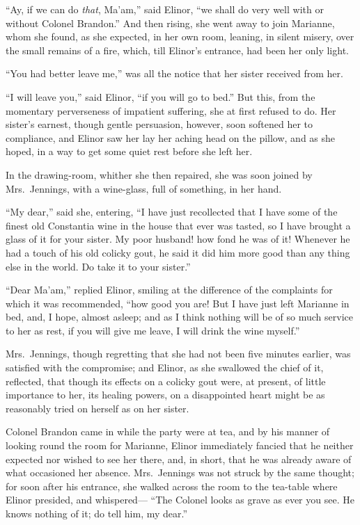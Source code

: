 \documentclass{article}
\begin{document}
``Ay, if we can do \emph{that}, Ma'am,'' said Elinor,
``we shall do very well with or without Colonel Brandon.''
And then rising, she went away to join Marianne,
whom she found, as she expected, in her own room, leaning,
in silent misery, over the small remains of a fire,
which, till Elinor's entrance, had been her only light.

``You had better leave me,'' was all the notice
that her sister received from her.

``I will leave you,'' said Elinor, ``if you will go
to bed.'' But this, from the momentary perverseness
of impatient suffering, she at first refused to do.
Her sister's earnest, though gentle persuasion, however,
soon softened her to compliance, and Elinor saw her
lay her aching head on the pillow, and as she hoped,
in a way to get some quiet rest before she left her.

In the drawing-room, whither she then repaired,
she was soon joined by Mrs.\ Jennings, with a wine-glass,
full of something, in her hand.

``My dear,'' said she, entering, ``I have just recollected
that I have some of the finest old Constantia wine in the
house that ever was tasted, so I have brought a glass of it
for your sister.  My poor husband! how fond he was of it!
Whenever he had a touch of his old colicky gout, he said
it did him more good than any thing else in the world.
Do take it to your sister.''

``Dear Ma'am,'' replied Elinor, smiling at the difference
of the complaints for which it was recommended, ``how good
you are!  But I have just left Marianne in bed, and, I hope,
almost asleep; and as I think nothing will be of so much
service to her as rest, if you will give me leave,
I will drink the wine myself.''

Mrs.\ Jennings, though regretting that she had not been
five minutes earlier, was satisfied with the compromise;
and Elinor, as she swallowed the chief of it, reflected,
that though its effects on a colicky gout were, at present,
of little importance to her, its healing powers,
on a disappointed heart might be as reasonably tried
on herself as on her sister.

Colonel Brandon came in while the party were at tea,
and by his manner of looking round the room for Marianne,
Elinor immediately fancied that he neither expected
nor wished to see her there, and, in short, that he
was already aware of what occasioned her absence.
Mrs.\ Jennings was not struck by the same thought;
for soon after his entrance, she walked across the room
to the tea-table where Elinor presided, and whispered---%
``The Colonel looks as grave as ever you see.  He knows
nothing of it; do tell him, my dear.''
\end{document}
